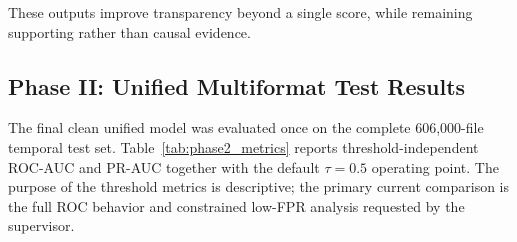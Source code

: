 \documentclass[conference]{IEEEtran}
\begin{document}
These outputs improve transparency beyond a single score, while remaining supporting rather than causal evidence.

% 


\subsection{Phase II: Unified Multiformat Test Results}
The final clean unified model was evaluated once on the complete 606,000-file temporal test set. Table~\ref{tab:phase2_metrics} reports threshold-independent ROC-AUC and PR-AUC together with the default $\tau=0.5$ operating point. The purpose of the threshold metrics is descriptive; the primary current comparison is the full ROC behavior and constrained low-FPR analysis requested by the supervisor.
\end{document}
